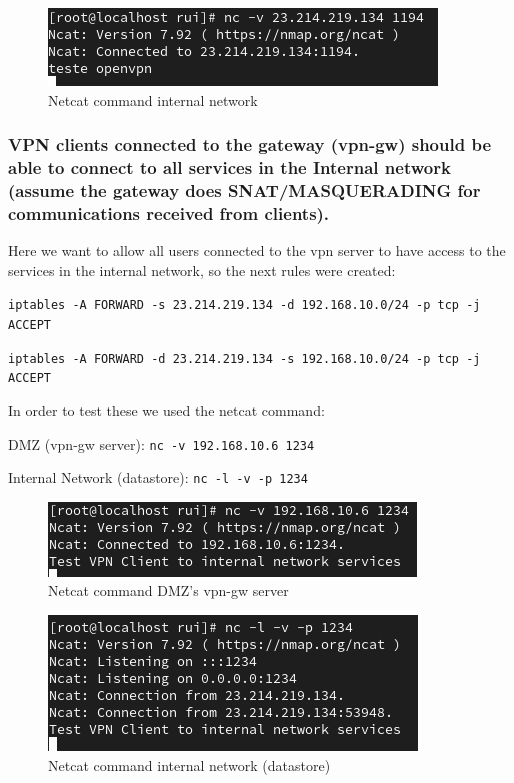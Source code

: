 \documentclass{article}
\begin{document}
\begin{figure}[H]
    \centering
    \includegraphics[scale=0.5]{btw/btw_openvpn_internal.png}
    \caption{Netcat command internal network}
    \label{fig:network-arc}
\end{figure}


\subsubsection{VPN clients connected to the gateway (vpn-gw) should be able to connect to all services in the Internal network (assume 
the gateway does SNAT/MASQUERADING for communications received from clients).}
\quad Here we want to allow all users connected to the vpn server to have access to the services in the internal network, so the next rules were created:


\texttt{}\par
\texttt{iptables -A FORWARD -s 23.214.219.134 -d 192.168.10.0/24 -p tcp -j ACCEPT }\par
\texttt{iptables -A FORWARD -d 23.214.219.134 -s 192.168.10.0/24 -p tcp -j ACCEPT}\par
\texttt{}\par


In order to test these we used the netcat command:
\texttt{}\par
\texttt{}\par
DMZ (vpn-gw server): \texttt{nc -v 192.168.10.6 1234} \par
Internal Network (datastore): \texttt{nc -l -v -p 1234} \par
\texttt{}\par
\begin{figure}[H]
    \centering
    \includegraphics[scale=0.5]{btw/btw_vpn_client_dmz.png}
    \caption{Netcat command DMZ's vpn-gw server}
    \label{fig:network-arc}
\end{figure}

\begin{figure}[H]
    \centering
    \includegraphics[scale=0.5]{btw/btw_vpn_client_internal.png}
    \caption{Netcat command internal network (datastore)}
    \label{fig:network-arc}
\end{figure}
\end{document}
